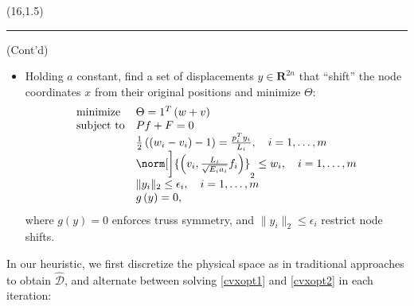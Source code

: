 \documentclass[a0]{a0poster}
\renewenvironment{leftbar}[1][\hsize]
{%
\def\FrameCommand 
{%

    {\color{black}\vrule width 0pt}%
    \hspace{0pt}%
    \fboxsep=\FrameSep\colorbox{white}%
}%
\MakeFramed{\hsize#1\advance\hsize-\width\FrameRestore}%
}
{\endMakeFramed}
\begin{document}
  \begin{textblock}{7.0}(16,1.5)
  
  \hrule
  \medskip
  (Cont'd)
  
  \begin{itemize}
  \item Holding \(a\) constant, find a set of displacements \(y\in\mathbf{R}^{2n}\) that ``shift'' the node coordinates \(x\) from their original positions and minimize \(\Theta\):
  {\small
  \begin{equation}
    \begin{array}{ll}
    \mbox{minimize}   & \Theta = 1^{T}\left(w+v \right)\\
    \mbox{subject to} & Pf+F = 0\\
              & \frac{1}{2}\left( \left( w_{i} - v_{i} \right) - 1 \right) = \frac{p_{i}^{T}y_{i}}{L_{i}},\ \ \ i = 1,\ldots,m\\
              & \norm[\bigg]{ \left( v_{i},\frac{L_{i}}{\sqrt{E_{i}a_{i}}}f_{i} \right)}_{2}\leq w_{i},\ \ \ i = 1,\ldots,m\\
              & \|y_{i}\|_{2} \leq \epsilon_{i},\ \ \ i = 1,\ldots,m\\
                  & g\left(y\right) = 0,
    \end{array}
    \label{cvxopt2}
  \end{equation}
  }
  where \(g(y) = 0 \) enforces truss symmetry, and \(\|y_{i}\|_{2} \leq\epsilon_{i}\) restrict node shifts.
  \end{itemize}
  
In our heuristic, we first discretize the physical space as in traditional approaches to obtain \(\hat{\mathcal{D}}\), and alternate between solving \eqref{cvxopt1} and \eqref{cvxopt2} in each iteration:
\medskip


\end{textblock}
\end{document}
